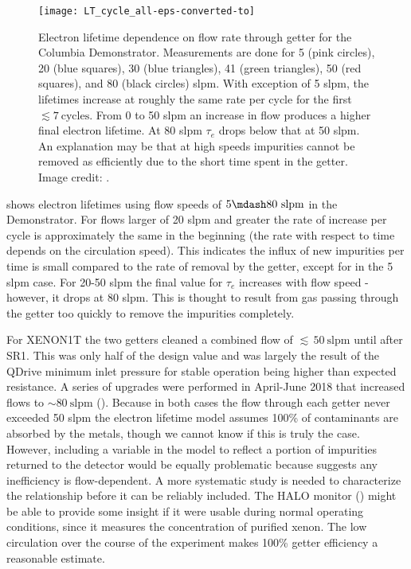 \begin{figure}
\centering
\texttt{[image: LT\_cycle\_all-eps-converted-to]}
\caption[Electron lifetime dependence on flow rate through getter for the Columbia Demonstrator.  Measurements are done for 5, 20, 30, 41,
50, and 80 slpm.]{Electron lifetime dependence on flow rate through getter for the Columbia Demonstrator.  Measurements are done for 5 (pink
circles), 20 (blue squares), 30 (blue
triangles), 41 (green triangles), 50 (red squares), and 80 (black circles) slpm.  With exception of 5 slpm, the lifetimes increase
at roughly the same rate per cycle for the first $\lesssim 7\ \mathrm{cycles}$.  From 0 to 50 slpm an increase in flow produces a higher
final electron
lifetime.  At 80 slpm $\tau_e$ drops below that at 50 slpm.  An explanation may be that at high speeds impurities cannot be removed as
efficiently due to the short time spent in the getter.  Image credit: .}
\label{fig:electron_lifetime_model_removal_demonstrator_circ}
\end{figure}

 shows electron lifetimes using flow speeds of $5 \mdash 80\ \mathrm{slpm}$
in the Demonstrator.  For flows larger of 20 slpm and greater the rate of increase per cycle is approximately the same in the beginning
(the rate with respect to time depends on the circulation speed).  This indicates the influx of new impurities per time is small
compared to the rate of removal by the getter, except for in the 5 slpm case.  For 20-50 slpm the final
value for $\tau_e$ increases with flow speed - however, it drops at 80 slpm.  This is thought
to result from gas passing through the getter too quickly to remove the impurities completely.

For XENON1T the two getters cleaned a combined flow of ${\lesssim}\, 50\ \mathrm{slpm}$ until after SR1.  This was only half of the design
value and was largely the result of the QDrive minimum inlet pressure for stable operation being higher than expected
resistance.  A series of upgrades were performed in April-June 2018 that increased flows to ${\sim} 80\ \mathrm{slpm}$
().  Because in both cases the flow through each getter never exceeded 50 slpm the electron
lifetime model assumes 100\% of contaminants are absorbed by the metals, though we cannot know if this is truly the case.  However,
including a variable in the model to reflect a portion of impurities returned
to the detector would be equally problematic because  suggests any
inefficiency is
flow-dependent.  A more systematic study is needed to characterize the relationship before it can be reliably included.  The HALO
monitor () might be able to provide some insight if it were usable during normal operating conditions, since it
measures the  concentration of purified xenon.  The low
circulation over the course of the experiment makes 100\% getter efficiency a reasonable estimate.

